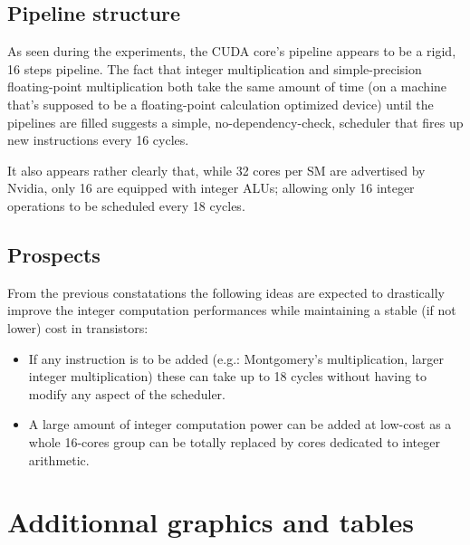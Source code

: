 \documentclass{article}
\begin{document}
    \subsection{Pipeline structure}
    As seen during the experiments, the CUDA core's pipeline appears to be a
    rigid, 16 steps pipeline. The fact that integer multiplication and 
    simple-precision floating-point multiplication both take the same amount
    of time (on a machine that's supposed to be a floating-point calculation
    optimized device) until the pipelines are filled suggests a simple,
    no-dependency-check, scheduler that fires up new instructions every 16 cycles.

    It also appears rather clearly that, while 32 cores per SM are advertised by
    Nvidia, only 16 are equipped with integer ALUs; allowing only 16 integer
    operations to be scheduled every 18 cycles.
    
    \subsection{Prospects}
    From the previous constatations the following ideas are expected to drastically
    improve the integer computation performances while maintaining a stable (if not
    lower) cost in transistors:
    \begin{itemize}
        \item If any instruction is to be added (e.g.: Montgomery's multiplication, larger integer multiplication) these can take up to 18 cycles without having to modify any aspect of the scheduler.
        \item A large amount of integer computation power can be added at low-cost as a whole 16-cores group can be totally replaced by cores dedicated to integer arithmetic.
    \end{itemize}
\section{Additionnal graphics and tables}
\end{document}
